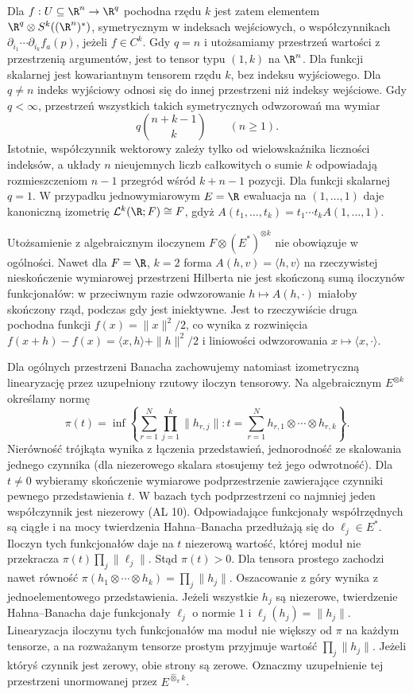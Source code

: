 Dla $f:U\subseteq\R^n\to\R^q$ pochodna
rzędu $k$ jest zatem elementem
$\R^q\otimes S^k((\R^n)^*)$, symetrycznym
w indeksach wejściowych, o współczynnikach
$\partial_{i_1}\cdots\partial_{i_k}f_a(p)$,
jeżeli $f\in C^k$. Gdy $q=n$ i utożsamiamy
przestrzeń wartości z przestrzenią argumentów,
jest to tensor typu $(1,k)$ na $\R^n$.
Dla funkcji skalarnej jest kowariantnym tensorem
rzędu $k$, bez indeksu wyjściowego.
Dla $q\ne n$ indeks wyjściowy odnosi się do innej
przestrzeni niż indeksy wejściowe. Gdy $q<\infty$, przestrzeń wszystkich
takich symetrycznych odwzorowań ma wymiar
\[
 q\binom{n+k-1}{k}\qquad(n\ge1).
\]
Istotnie, współczynnik wektorowy zależy tylko
od wielowskaźnika liczności indeksów, a układy
$n$ nieujemnych liczb całkowitych o sumie $k$
odpowiadają rozmieszczeniom $n-1$ przegród
wśród $k+n-1$ pozycji. Dla funkcji skalarnej
$q=1$. W przypadku jednowymiarowym $E=\R$
ewaluacja na $(1,\ldots,1)$ daje kanoniczną
izometrię $\mathcal L^k(\R;F)\cong F$,
gdyż $A(t_1,\ldots,t_k)=t_1\cdots t_k A(1,\ldots,1)$.

\begin{uwaga}
Utożsamienie z algebraicznym iloczynem
$F\otimes(E^*)^{\otimes k}$ nie obowiązuje
w ogólności. Nawet dla $F=\R$, $k=2$
forma $A(h,v)=\langle h,v\rangle$ na rzeczywistej
nieskończenie wymiarowej przestrzeni Hilberta
nie jest skończoną sumą iloczynów funkcjonałów:
w przeciwnym razie odwzorowanie
$h\mapsto A(h,\cdot)$ miałoby skończony rząd,
podczas gdy jest iniektywne.
Jest to rzeczywiście druga pochodna funkcji
$f(x)=\|x\|^2/2$, co wynika z rozwinięcia
$f(x+h)-f(x)=\langle x,h\rangle+\|h\|^2/2$
i liniowości odwzorowania $x\mapsto\langle x,\cdot\rangle$.
\end{uwaga}

Dla ogólnych przestrzeni Banacha zachowujemy
natomiast izometryczną linearyzację przez
uzupełniony rzutowy iloczyn tensorowy.
Na algebraicznym $E^{\otimes k}$ określamy normę
\[
 \pi(t)=\inf\left\{\sum_{r=1}^N
       \prod_{j=1}^k\|h_{r,j}\|:
       t=\sum_{r=1}^N h_{r,1}\otimes\cdots\otimes h_{r,k}
       \right\}.
\]
Nierówność trójkąta wynika z łączenia
przedstawień, jednorodność ze skalowania
jednego czynnika (dla niezerowego skalara
stosujemy też jego odwrotność).
Dla $t\ne0$ wybieramy skończenie wymiarowe
podprzestrzenie zawierające czynniki pewnego
przedstawienia $t$. W bazach tych podprzestrzeni
co najmniej jeden współczynnik jest niezerowy
(AL 10). Odpowiadające funkcjonały współrzędnych
są ciągłe i na mocy twierdzenia Hahna--Banacha
przedłużają się do $\ell_j\in E^*$.
Iloczyn tych funkcjonałów daje na $t$
niezerową wartość, której moduł nie przekracza
$\pi(t)\prod_j\|\ell_j\|$. Stąd $\pi(t)>0$.
Dla tensora prostego zachodzi nawet równość
$\pi(h_1\otimes\cdots\otimes h_k)=\prod_j\|h_j\|$.
Oszacowanie z góry wynika z jednoelementowego
przedstawienia. Jeżeli wszystkie $h_j$ są niezerowe,
twierdzenie Hahna--Banacha daje funkcjonały
$\ell_j$ o normie $1$ i $\ell_j(h_j)=\|h_j\|$.
Linearyzacja iloczynu tych funkcjonałów ma moduł
nie większy od $\pi$ na każdym tensorze, a na
rozważanym tensorze prostym przyjmuje wartość
$\prod_j\|h_j\|$. Jeżeli któryś czynnik jest zerowy,
obie strony są zerowe.
Oznaczmy uzupełnienie tej przestrzeni unormowanej
przez $E^{\widehat\otimes_\pi k}$.

